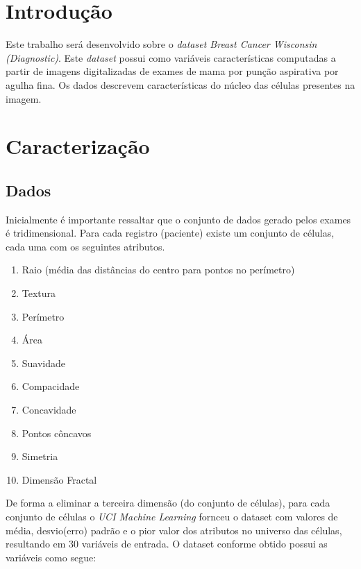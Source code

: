 \documentclass[11pt,a4paper]{article}
\numberwithin{equation}{section}
\begin{document}

\section{Introdução}
Este trabalho será desenvolvido sobre o \textit{dataset Breast Cancer Wisconsin (Diagnostic)}. Este \textit{dataset} possui como variáveis características computadas a partir de imagens digitalizadas de exames de mama por punção aspirativa por agulha fina. Os dados descrevem características do núcleo das células presentes na imagem. 
\section{Caracterização}

\subsection{Dados}


Inicialmente é importante ressaltar que o conjunto de dados gerado pelos exames é tridimensional. Para cada registro (paciente) existe um conjunto de células, cada uma com os seguintes atributos.

\begin{enumerate}
\item Raio (média das distâncias do centro para pontos no perímetro)
\item Textura
\item Perímetro
\item Área
\item Suavidade
\item Compacidade
\item Concavidade
\item Pontos côncavos
\item Simetria
\item Dimensão Fractal
\end{enumerate}

De forma a eliminar a terceira dimensão (do conjunto de células), para cada conjunto de células o \textit{UCI Machine Learning} fornceu o dataset com valores de média, desvio(erro) padrão e o pior valor dos atributos no universo das células, resultando em 30 variáveis de entrada. O dataset conforme obtido possui as variáveis como segue:
\end{document}
